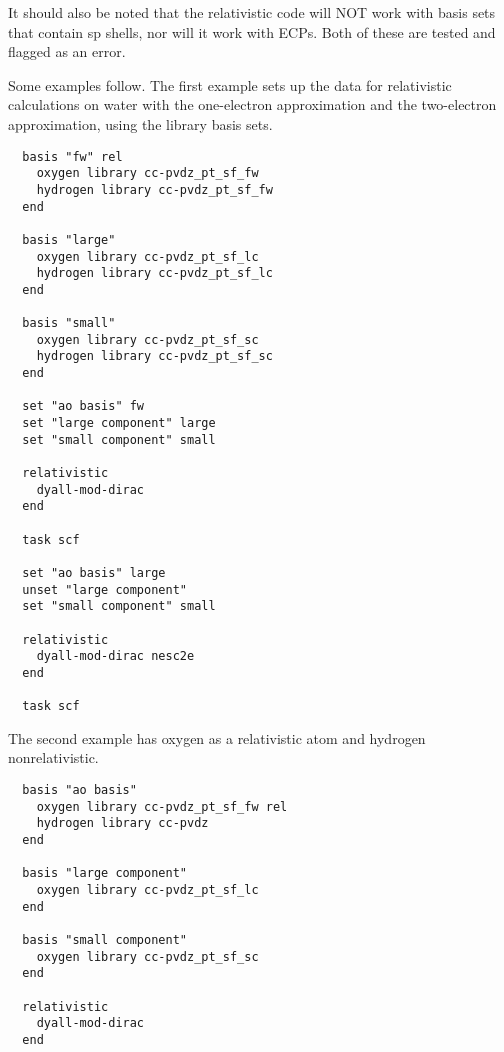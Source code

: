 It should also be noted that the relativistic code will NOT work with basis
sets that contain sp shells, nor will it work with ECPs. Both of these are
tested and flagged as an error.

Some examples follow. The first example sets up the data for relativistic
calculations on water with the one-electron approximation and the
two-electron approximation, using the library basis sets.

\begin{verbatim}
  basis "fw" rel
    oxygen library cc-pvdz_pt_sf_fw
    hydrogen library cc-pvdz_pt_sf_fw
  end

  basis "large"
    oxygen library cc-pvdz_pt_sf_lc
    hydrogen library cc-pvdz_pt_sf_lc
  end

  basis "small"
    oxygen library cc-pvdz_pt_sf_sc
    hydrogen library cc-pvdz_pt_sf_sc
  end

  set "ao basis" fw
  set "large component" large
  set "small component" small

  relativistic
    dyall-mod-dirac
  end

  task scf

  set "ao basis" large
  unset "large component"
  set "small component" small

  relativistic
    dyall-mod-dirac nesc2e
  end

  task scf

\end{verbatim}

The second example has oxygen as a relativistic atom and hydrogen nonrelativistic.

\begin{verbatim}
  basis "ao basis"
    oxygen library cc-pvdz_pt_sf_fw rel
    hydrogen library cc-pvdz
  end

  basis "large component"
    oxygen library cc-pvdz_pt_sf_lc
  end

  basis "small component"
    oxygen library cc-pvdz_pt_sf_sc
  end

  relativistic
    dyall-mod-dirac
  end
\end{verbatim}
